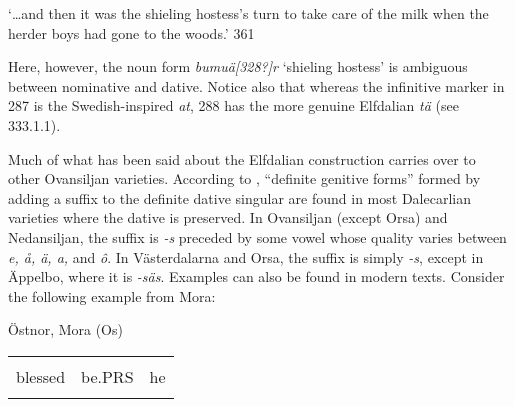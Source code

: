 \begin{styleTranslation}
‘…and then it was the shieling hostess’s turn to take care of the milk when the herder boys had gone to the woods.’ 361

\end{styleTranslation}

\begin{styleBodytextC}
Here, however, the noun form \textit{bumuä[328?]r} ‘shieling hostess’ is ambiguous between nominative and dative. Notice also that whereas the infinitive marker in 287 is the Swedish-inspired \textit{at}, 288 has the more genuine Elfdalian \textit{tä} (see 333.1.1). 

\end{styleBodytextC}

\begin{styleBodytextC}
Much of what has been said about the Elfdalian construction carries over to other Ovansiljan varieties. According to \citet[170]{Levander1928}, “definite genitive forms” formed by adding a suffix to the definite dative singular are found in most Dalecarlian varieties where the dative is preserved. In Ovansiljan (except Orsa) and Nedansiljan, the suffix is\textit{ -s} preceded by some vowel whose quality varies between \textit{e, å, ä, a,} and \textit{ô}. In Västerdalarna and Orsa, the suffix is simply\textit{ -s}, except in Äppelbo, where it is\textit{ -säs}. Examples can also be found in modern texts. Consider the following example from Mora:

\end{styleBodytextC}

\begin{listWWNumileveli}
\item 

\begin{styleExample}
Östnor, Mora (Os)

\end{styleExample}

\end{listWWNumileveli}

\begin{tabular}{lll}
\lsptoprule
\multicolumn{3}{l}{Welsignarn

}\\
blessed & be.PRS & he\\
\lspbottomrule
\end{tabular}

